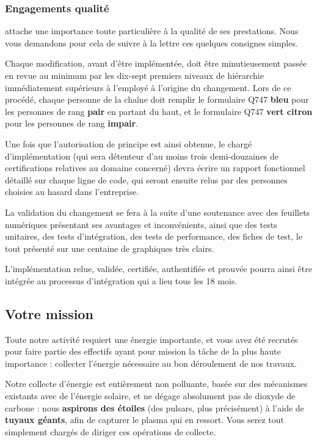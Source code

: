 \subsubsection{Engagements qualité}

\provogon{} attache une importance toute particulière à la qualité de ses
prestations. Nous vous demandons pour cela de suivre à la lettre ces quelques
consignes simples.

Chaque modification, avant d'être implémentée, doit être minutieusement passée
en revue au minimum par les dix-sept premiers niveaux de hiérarchie
immédiatement supérieurs à l'employé à l'origine du changement.  Lors de ce
procédé, chaque personne de la chaîne doit remplir le formulaire Q747
\textbf{bleu} pour les personnes de rang \textbf{pair} en partant du haut, et
le formulaire Q747 \textbf{vert citron} pour les personnes de rang
\textbf{impair}.

Une fois que l'autorisation de principe est ainsi obtenue, le chargé
d'implémentation (qui sera détenteur d'au moins trois demi-douzaines de
certifications relatives au domaine concerné) devra écrire un rapport
fonctionnel détaillé sur chaque ligne de code, qui seront ensuite relus par des
personnes choisies au hasard dans l'entreprise.

La validation du changement se fera à la suite d'une soutenance avec des feuillets numériques
présentant ses avantages et inconvénients, ainsi que des tests unitaires, des
tests d'intégration, des tests de performance, des fiches de test, le tout
présenté sur une centaine de graphiques très clairs.

L'implémentation relue, validée, certifiée, authentifiée et prouvée pourra
ainsi être intégrée au processus d'intégration qui a lieu tous les 18 mois.

\subsection{Votre mission}
\label{sec:mission}

Toute notre activité requiert une énergie importante, et vous avez été recrutés
pour faire partie des effectifs ayant pour mission la tâche de la plus haute
importance : collecter l'énergie nécessaire au bon déroulement de nos travaux.

Notre collecte d'énergie est entièrement non polluante, basée sur des
mécanismes existants avec de l'énergie solaire, et ne dégage absolument pas de
dioxyde de carbone : nous \textbf{aspirons des étoiles} (des pulsars, plus
précisément) à l'aide de \textbf{tuyaux géants}, afin de capturer le plasma qui
en ressort. Vous serez tout simplement chargés de diriger ces opérations de
collecte.

